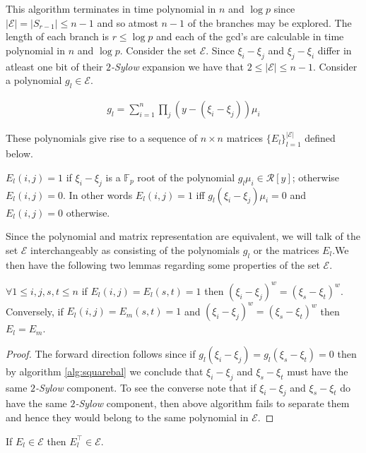 \vskip 1cm
This algorithm terminates in time polynomial in $n$ and $\log{p}$ since $|\mathcal{E}|=|S_{r-1}| \le n-1$ and so atmost $n-1$ of the branches may be explored. The length of each branch is $r \le \log{p}$ and
each of the gcd's are calculable in time polynomial in $n$ and $\log{p}$. Consider the set $\mathcal{E}$. Since $\xi_i-\xi_j$ and $\xi_j-\xi_i$ differ in atleast one bit of their \emph{$2$-Sylow} expansion we have that
$2 \le |\mathcal{E}| \le n-1$. Consider a polynomial $g_l \in \mathcal{E}$.

\begin{align*}
	g_l = \sum_{i=1}^n \prod_{j} (y-(\xi_i-\xi_j)) \mu_i
\end{align*}

These polynomials give rise to a sequence of $n \times n$ matrices $\{E_l\}_{l=1}^{|\mathcal{E}|}$ defined below.

\begin{definition}\label{matrixdef}
	$E_l(i,j)=1$ if $\xi_i-\xi_j$ is a $\mathbb{F}_p$ root of the polynomial $g_l\mu_i \in \mathcal{R}[y]$; otherwise $E_l(i,j)=0$. In other words $E_l(i,j)=1$ iff  $g_l(\xi_i-\xi_j)\mu_i=0$ and $E_l(i,j)=0$ otherwise.
\end{definition}

Since the polynomial and matrix representation are equivalent, we will talk of the set $\mathcal{E}$ interchangeably as consisting of the polynomials $g_l$ or the matrices $E_l$.We then have the following two lemmas regarding some
properties of the set $\mathcal{E}$.

\begin{lemma} \label{welldef}
	$\forall 1\le i,j,s,t \le n$ if $E_l(i,j)=E_l(s,t)=1$ then $(\xi_i-\xi_j)^w=(\xi_s-\xi_t)^w$. Conversely, if $E_l(i,j)=E_m(s,t)=1$ and
	$(\xi_i-\xi_j)^w=(\xi_s-\xi_t)^w$ then $E_l=E_m$.
\end{lemma}

\begin{proof}
	The forward direction follows since if $g_l(\xi_i-\xi_j)=g_l(\xi_s-\xi_t)=0$ then by algorithm \ref{alg:squarebal} we conclude that $\xi_i-\xi_j$ and $\xi_s-\xi_t$ must have the same \emph{$2$-Sylow} component. To see the
	converse note that if $\xi_i-\xi_j$ and $\xi_s-\xi_t$ do have the same 
	\emph{$2$-Sylow} component, then above algorithm fails to separate them and hence they would belong to the same polynomial in $\mathcal{E}$.
\end{proof}


\begin{lemma}\label{transpose}
	If $E_l \in \mathcal{E}$ then $E_l^\top \in \mathcal{E}$.
\end{lemma}

